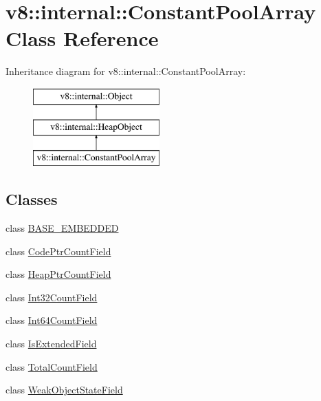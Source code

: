 \hypertarget{classv8_1_1internal_1_1_constant_pool_array}{}\section{v8\+:\+:internal\+:\+:Constant\+Pool\+Array Class Reference}
\label{classv8_1_1internal_1_1_constant_pool_array}
Inheritance diagram for v8\+:\+:internal\+:\+:Constant\+Pool\+Array\+:\begin{figure}[H]
\begin{center}
\leavevmode
\includegraphics[height=3.000000cm]{classv8_1_1internal_1_1_constant_pool_array}
\end{center}
\end{figure}
\subsection*{Classes}
\begin{DoxyCompactItemize}
\item 
class \hyperlink{classv8_1_1internal_1_1_constant_pool_array_1_1_b_a_s_e___e_m_b_e_d_d_e_d}{B\+A\+S\+E\+\_\+\+E\+M\+B\+E\+D\+D\+E\+D}
\item 
class \hyperlink{classv8_1_1internal_1_1_constant_pool_array_1_1_code_ptr_count_field}{Code\+Ptr\+Count\+Field}
\item 
class \hyperlink{classv8_1_1internal_1_1_constant_pool_array_1_1_heap_ptr_count_field}{Heap\+Ptr\+Count\+Field}
\item 
class \hyperlink{classv8_1_1internal_1_1_constant_pool_array_1_1_int32_count_field}{Int32\+Count\+Field}
\item 
class \hyperlink{classv8_1_1internal_1_1_constant_pool_array_1_1_int64_count_field}{Int64\+Count\+Field}
\item 
class \hyperlink{classv8_1_1internal_1_1_constant_pool_array_1_1_is_extended_field}{Is\+Extended\+Field}
\item 
class \hyperlink{classv8_1_1internal_1_1_constant_pool_array_1_1_total_count_field}{Total\+Count\+Field}
\item 
class \hyperlink{classv8_1_1internal_1_1_constant_pool_array_1_1_weak_object_state_field}{Weak\+Object\+State\+Field}
\end{DoxyCompactItemize}
